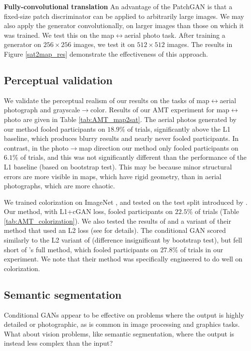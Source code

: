 {\bf Fully-convolutional translation} An advantage of the PatchGAN is that a fixed-size patch discriminator can be applied to arbitrarily large images. We may also apply the generator convolutionally, on larger images than those on which it was trained. We test this on the map$\leftrightarrow$aerial photo task. After training a generator on $256\times256$ images, we test it on $512\times512$ images. The results in Figure \ref{sat2map_res} demonstrate the effectiveness of this approach.

\subsection{Perceptual validation}

We validate the perceptual realism of our results on the tasks of map$\leftrightarrow$aerial photograph and grayscale$\rightarrow$color. Results of our AMT experiment for map$\leftrightarrow$photo are given in Table \ref{tab:AMT_map2sat}. The aerial photos generated by our method fooled participants on $18.9\%$ of trials, significantly above the L1 baseline, which produces blurry results and nearly never fooled participants. In contrast, in the photo$\rightarrow$map direction our method only fooled participants on $6.1$\% of trials, and this was not significantly different than the performance of the L1 baseline (based on bootstrap test). This may be because minor structural errors are more visible in maps, which have rigid geometry, than in aerial photographs, which are more chaotic.

We trained colorization on ImageNet \cite{russakovsky2015imagenet}, and tested on the test split introduced by \cite{zhang2016colorful, larsson2016learning}. Our method, with L1+cGAN loss, fooled participants on $22.5\%$ of trials (Table \ref{tab:AMT_colorization}). We also tested the results of \cite{zhang2016colorful} and a variant of their method that used an L2 loss (see \cite{zhang2016colorful} for details). The conditional GAN scored similarly to the L2 variant of \cite{zhang2016colorful} (difference insignificant by bootstrap test), but fell short of \cite{zhang2016colorful}'s full method, which fooled participants on $27.8\%$ of trials in our experiment. We note that their method was specifically engineered to do well on colorization.

\subsection{Semantic segmentation} Conditional GANs appear to be effective on problems where the output is highly detailed or photographic, as is common in image processing and graphics tasks. What about vision problems, like semantic segmentation, where the output is instead less complex than the input?

